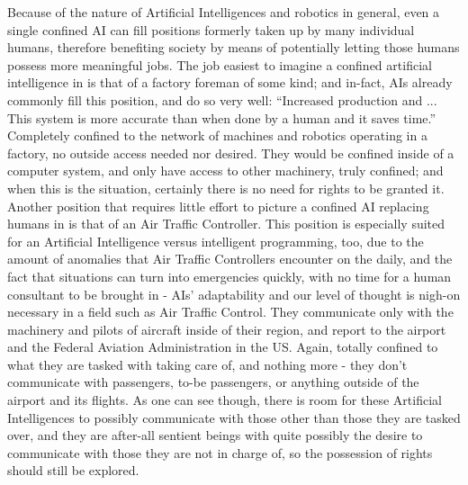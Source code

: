 Because of the nature of Artificial Intelligences and robotics in general, even a single confined AI can fill positions formerly taken up by many individual humans, therefore benefiting society by means of potentially letting those humans possess more meaningful jobs. The job easiest to imagine a confined artificial intelligence in is that of a factory foreman of some kind; and in-fact, AIs already commonly fill this position, and do so very well: “Increased production and ... This system is more accurate than when done by a human and it saves time.” \cite{Artif12:online} Completely confined to the network of machines and robotics operating in a factory, no outside access needed nor desired. They would be confined inside of a computer system, and only have access to other machinery, truly confined; and when this is the situation, certainly there is no need for rights to be granted it. Another position that requires little effort to picture a confined AI replacing humans in is that of an Air Traffic Controller. This position is especially suited for an Artificial Intelligence versus intelligent programming, too, due to the amount of anomalies that Air Traffic Controllers encounter on the daily, and the fact that situations can turn into emergencies quickly, with no time for a human consultant to be brought in - AIs' adaptability and our level of thought is nigh-on necessary in a field such as Air Traffic Control. They communicate only with the machinery and pilots of aircraft inside of their region, and report to the airport and the Federal Aviation Administration in the US. Again, totally confined to what they are tasked with taking care of, and nothing more - they don't communicate with passengers, to-be passengers, or anything outside of the airport and its flights. As one can see though, there is room for these Artificial Intelligences to possibly communicate with those other than those they are tasked over, and they are after-all sentient beings with quite possibly the desire to communicate with those they are not in charge of, so the possession of rights should still be explored.